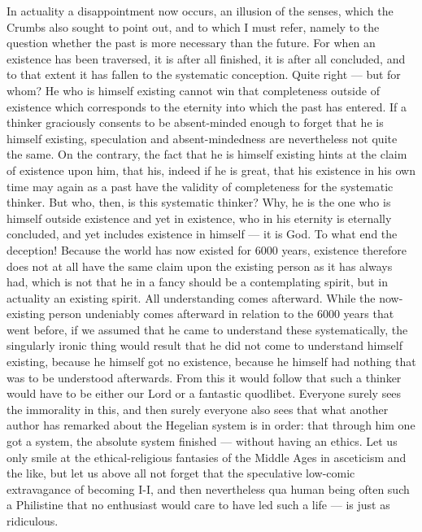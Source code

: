 \documentclass[12pt,a4paper,openany]{book}
\newcommand{\opage}[1]{\marginnote{\footnotesize\textit{[#1]}}}
\begin{document}
In actuality a disappointment now occurs,
\setcounter{footnote}{0}%
\opage{180}an illusion of the senses, which the Crumbs also sought to point out, and to
which I must refer, namely to the question whether the past is more necessary than the
future. For when an existence has been traversed, it is after all finished, it is
after all concluded, and to that extent it has fallen to the systematic conception.
Quite right --- but for whom? He who is himself existing cannot win that completeness
outside of existence which corresponds to the eternity into which the past has entered.
If a thinker graciously consents to be absent-minded enough to forget that he is
himself existing, speculation and absent-mindedness are nevertheless not quite the
same. On the contrary, the fact that he is himself existing hints at the claim of
existence upon him, that his, indeed if he is great, that his existence in his own
time may again as a past have the validity of completeness for the systematic
thinker. But who, then, is this systematic thinker? Why, he is the one who is himself
outside existence and yet in existence, who in his eternity is eternally concluded,
and yet includes existence in himself --- it is God. To what end the deception!
Because the world has now existed for 6000 years, existence therefore does not at all
have the same claim upon the existing person as it has always had, which is not that
he in a fancy should be a contemplating spirit, but in actuality an existing
spirit. All understanding comes afterward. While the now-existing person undeniably
comes afterward in relation to the 6000 years that went before, if we assumed that he
came to understand these systematically, the singularly ironic thing would result that
he did not come to understand himself existing, because he himself got no existence,
because he himself had nothing that was to be understood afterwards. From this it
would follow that such a thinker would have to be either our Lord or a fantastic
quodlibet. Everyone surely sees the immorality in this, and then surely everyone also
sees that what another author has remarked about the Hegelian system is in order: that
through him one got a system, the absolute system finished --- without having an
ethics.
\setcounter{footnote}{0}%
\opage{181}Let us only smile at the ethical-religious fantasies of the Middle Ages in
asceticism and the like, but let us above all not forget that the speculative low-comic
extravagance of becoming I-I, and then nevertheless qua human being often such a
Philistine that no enthusiast would care to have led such a life --- is just as
ridiculous.
\end{document}
